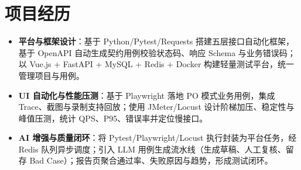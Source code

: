 \documentclass[10pt]{article}
\begin{document}
    \vspace{0.25em}




    \section[项目经历]{\makebox[\iconwidth][c]{\color{primarycolor}{\faProjectDiagram}}\quad 项目经历}

    \begin{itemize}
        \item \textbf{平台与框架设计}：基于 Python/Pytest/Requests 搭建五层接口自动化框架，基于 OpenAPI 自动生成契约用例校验状态码、响应 Schema 与业务错误码；以 Vue.js + FastAPI + MySQL + Redis + Docker 构建轻量测试平台，统一管理项目与用例。
        \item \textbf{UI 自动化与性能压测}：基于 Playwright 落地 PO 模式业务用例，集成 Trace、截图与录制支持回放；使用 JMeter/Locust 设计阶梯加压、稳定性与峰值压测，统计 QPS、P95、错误率并定位慢接口。
        \item \textbf{AI 增强与质量闭环}：将 Pytest/Playwright/Locust 执行封装为平台任务，经 Redis 队列异步调度；引入 LLM 用例生成流水线（生成草稿、人工复核、留存 Bad Case）；报告页聚合通过率、失败原因与趋势，形成测试闭环。
    \end{itemize}
\end{document}
